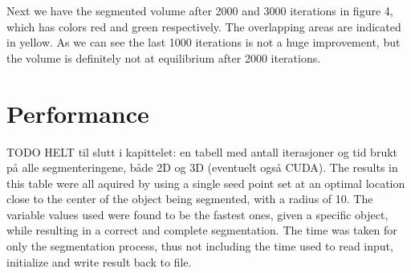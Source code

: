 Next we have the segmented volume after 2000 and 3000 iterations in figure 4, which has colors red and green respectively. The overlapping areas are indicated in yellow. As we can see the last 1000 iterations is not a huge improvement, but the volume is definitely not at equilibrium after 2000 iterations. 


\section{Performance}
TODO 
HELT til slutt i kapittelet: en tabell med antall iterasjoner og tid brukt på alle segmenteringene, både 2D og 3D (eventuelt også CUDA). The results in this table were all aquired by using a single seed point set at an optimal location close to the center of the object being segmented, with a radius of 10. The variable values used were found to be the fastest ones, given a specific object, while resulting in a correct and complete segmentation. The time was taken for only the segmentation process, thus not including the time used to read input, initialize and write result back to file.